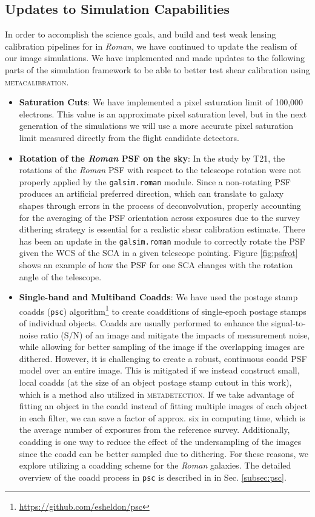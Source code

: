 \documentclass[fleqn,usenatbib]{mnras}
\begin{document}
\subsection{Updates to Simulation Capabilities}
In order to accomplish the science goals, and build and test weak lensing calibration pipelines for in \emph{Roman}, we have continued to update the realism of our image simulations. We have implemented and made updates to the following parts of the simulation framework to be able to better test shear calibration using \textsc{metacalibration}. 
\begin{itemize}
    \setlength\itemsep{1em}
    \item \textbf{Saturation Cuts}:
    We have implemented a pixel saturation limit of 100,000 electrons. This value is an approximate pixel saturation level, but in the next generation of the simulations we will use a more accurate pixel saturation limit measured directly from the flight candidate detectors. 
    
    \item \textbf{Rotation of the \emph{Roman} PSF on the sky}:
    In the study by T21, the rotations of the \emph{Roman} PSF with respect to the telescope rotation were not properly applied by the \texttt{galsim.roman} module. Since a non-rotating PSF produces an artificial preferred direction, which can translate to galaxy shapes through errors in the process of deconvolvution, properly accounting for the averaging of the PSF orientation across exposures due to the survey dithering strategy is essential for a realistic shear calibration estimate. There has been an update in the \texttt{galsim.roman} module to correctly rotate the PSF given the WCS of the SCA in a given telescope pointing. Figure \ref{fig:psfrot} shows an example of how the PSF for one SCA changes with the rotation angle of the telescope.
    
    \item \textbf{Single-band and Multiband Coadds}: 
    We have used the postage stamp coadds (\texttt{psc}) algorithm\footnote{\url{https://github.com/esheldon/psc}} to create coadditions of single-epoch postage stamps of individual objects. Coadds are usually performed to enhance the signal-to-noise ratio (S/N) of an image and mitigate the impacts of measurement noise, while allowing for better sampling of the image if the overlapping images are dithered. However, it is challenging to create a robust, continuous coadd PSF model over an entire image. This is mitigated if we instead construct small, local coadds (at the size of an object postage stamp cutout in this work), which is a method also utilized in \textsc{metadetection}. If we take advantage of fitting an object in the coadd instead of fitting multiple images of each object in each filter, we can save a factor of approx. six in computing time, which is the average number of exposures from the reference survey. Additionally, coadding is one way to reduce the effect of the undersampling of the images since the coadd can be better sampled due to dithering. For these reasons, we explore utilizing a coadding scheme for the \emph{Roman} galaxies. The detailed overview of the coadd process in \texttt{psc} is described in in Sec. \ref{subsec:psc}. 
    

\end{itemize}
\end{document}
